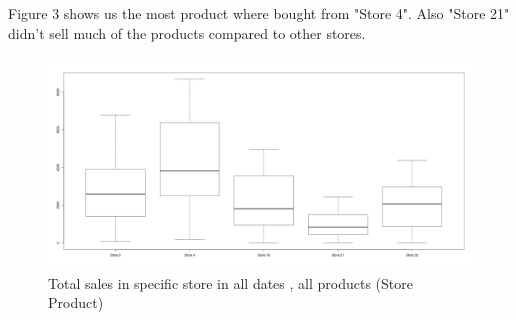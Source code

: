 \documentclass{article}
\begin{document}
Figure 3 shows us the most product where bought from "Store 4". Also "Store 21" didn't sell much of the products compared to other stores.
\begin{figure}[H]
\begin{center}
\includegraphics[scale=0.3]{boxplotStores.png}
\end{center}
\caption{Total sales in specific store in all dates , all products (Store ~ Product)}
\end{figure}
\end{document}

